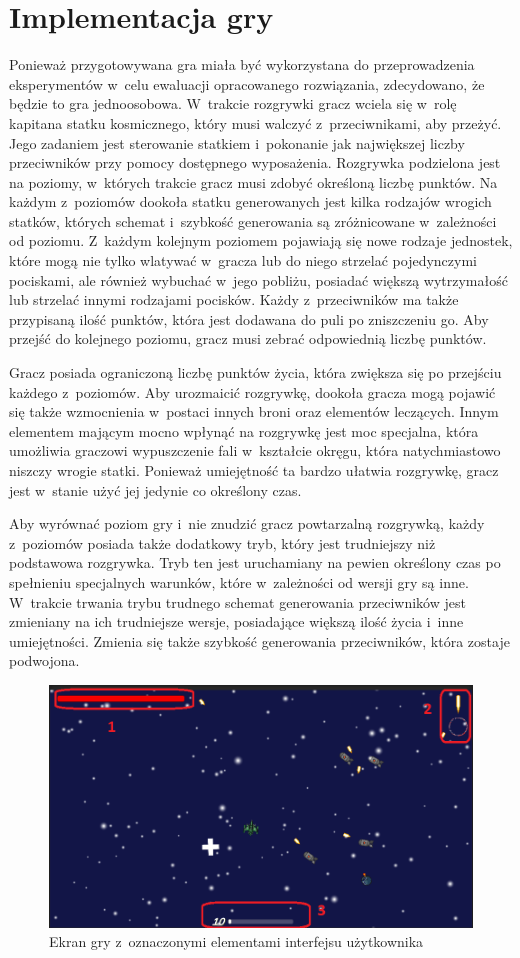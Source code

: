 \section{Implementacja gry}
Ponieważ przygotowywana gra miała być wykorzystana do przeprowadzenia eksperymentów w~celu ewaluacji opracowanego rozwiązania, zdecydowano, że będzie to gra jednoosobowa. W~trakcie rozgrywki gracz wciela się w~rolę kapitana statku kosmicznego, który musi walczyć z~przeciwnikami, aby przeżyć. Jego zadaniem jest sterowanie statkiem i~pokonanie jak największej liczby przeciwników przy pomocy dostępnego wyposażenia. Rozgrywka podzielona jest na poziomy, w~których trakcie gracz musi zdobyć określoną liczbę punktów. Na każdym z~poziomów dookoła statku generowanych jest kilka rodzajów wrogich statków, których schemat i~szybkość generowania są zróżnicowane w~zależności od poziomu. Z~każdym kolejnym poziomem pojawiają się nowe rodzaje jednostek, które mogą nie tylko wlatywać w~gracza lub do niego strzelać pojedynczymi pociskami, ale również wybuchać w~jego pobliżu, posiadać większą wytrzymałość lub strzelać innymi rodzajami pocisków. Każdy z~przeciwników ma także przypisaną ilość punktów, która jest dodawana do puli po zniszczeniu go. Aby przejść do kolejnego poziomu, gracz musi zebrać odpowiednią liczbę punktów.

Gracz posiada ograniczoną liczbę punktów życia, która zwiększa się po przejściu każdego z~poziomów. Aby urozmaicić rozgrywkę, dookoła gracza mogą pojawić się także wzmocnienia w~postaci innych broni oraz elementów leczących. Innym elementem mającym mocno wpłynąć na rozgrywkę jest moc specjalna, która umożliwia graczowi wypuszczenie fali w~kształcie okręgu, która natychmiastowo niszczy wrogie statki. Ponieważ umiejętność ta bardzo ułatwia rozgrywkę, gracz jest w~stanie użyć jej jedynie co określony czas. 

Aby wyrównać poziom gry i~nie znudzić gracz powtarzalną rozgrywką, każdy z~poziomów posiada także dodatkowy tryb, który jest trudniejszy niż podstawowa rozgrywka. Tryb ten jest uruchamiany na pewien określony czas po spełnieniu specjalnych warunków, które w~zależności od wersji gry są inne. W~trakcie trwania trybu trudnego schemat generowania przeciwników jest zmieniany na ich trudniejsze wersje, posiadające większą ilość życia i~inne umiejętności. Zmienia się także szybkość generowania przeciwników, która zostaje podwojona.

\begin{figure}
	\centering
	\includegraphics[width=0.7\linewidth]{images/ui.png}
	\caption{Ekran gry z~oznaczonymi elementami interfejsu użytkownika}
	\label{fig:ui}
\end{figure}

